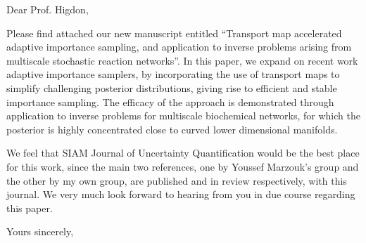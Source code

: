 \documentclass{letter}
\begin{document}
\date{}
\begin{letter}{ }

\opening{Dear Prof. Higdon,}

Please find attached our new manuscript entitled ``Transport map accelerated adaptive importance sampling, and application to inverse problems arising from
  multiscale stochastic reaction networks''. In this paper, we expand
  on recent work adaptive importance samplers, by incorporating the
  use of transport maps to simplify challenging posterior
  distributions, giving rise to efficient and stable importance
  sampling. The efficacy of the approach is demonstrated through
  application to inverse problems for multiscale biochemical networks,
  for which the posterior is highly concentrated close to curved lower
  dimensional manifolds. 

We feel that SIAM Journal of Uncertainty
  Quantification would be the best place for this work, since the main
  two references, one by Youssef Marzouk's group and the other by my
  own group, are published and in review respectively, with this journal.
We very much look forward to hearing from you in due course regarding this paper.

\closing{Yours sincerely,}
\end{letter}
\end{document}

